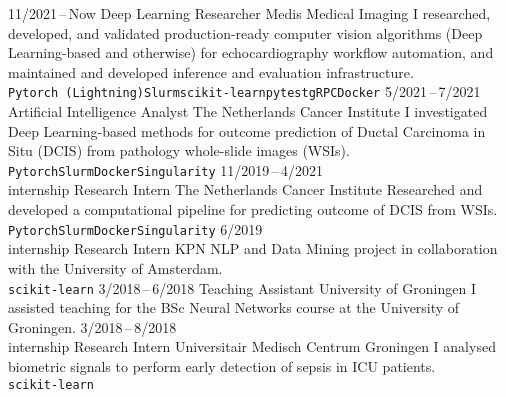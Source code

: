 \documentclass[9pt]{developercv}
\begin{document}
\vspace{.5cm}




\begin{entrylist}
\entry
    {11/2021\,--\,Now}
    {Deep Learning Researcher}
    {Medis Medical Imaging}
    {I researched, developed, and validated production-ready computer vision algorithms (Deep Learning-based and otherwise) for echocardiography workflow automation, and maintained and developed inference and evaluation infrastructure.\\
    \texttt{Pytorch (Lightning)}\dotsepb\texttt{Slurm}\dotsepb\texttt{scikit-learn}\dotsepb\texttt{pytest}\dotsepb\texttt{gRPC}\dotsepb\texttt{Docker}}
\entry
    {5/2021\,--\,7/2021}
    {Artificial Intelligence Analyst}
    {The Netherlands Cancer Institute}
    {I investigated Deep Learning-based methods for outcome prediction of Ductal Carcinoma in Situ (DCIS) from pathology whole-slide images (WSIs).\\
    \texttt{Pytorch}\dotsepb\texttt{Slurm}\dotsepb\texttt{Docker}\dotsepb\texttt{Singularity}}
\entry
    {11/2019\,--\,4/2021\\\footnotesize{internship}}
    {Research Intern}
    {The Netherlands Cancer Institute}
    {Researched and developed a computational pipeline for predicting outcome of DCIS from WSIs.\\
    \texttt{Pytorch}\dotsepb\texttt{Slurm}\dotsepb\texttt{Docker}\dotsepb\texttt{Singularity}}
\entry
    {6/2019\\\footnotesize{internship}}
    {Research Intern}
    {KPN}
    {NLP and Data Mining project in collaboration with the University of Amsterdam.\\
    \texttt{scikit-learn}}
\entry
    {3/2018\,--\,6/2018}
    {Teaching Assistant}
    {University of Groningen}
    {I assisted teaching for the BSc Neural Networks course at the University of Groningen.}
\entry
    {3/2018\,--\,8/2018\\\footnotesize{internship}}
    {Research Intern}
    {Universitair Medisch Centrum Groningen}
    {I analysed biometric signals to perform early detection of sepsis in ICU patients.\\
    \texttt{scikit-learn}}
\end{entrylist}
\end{document}

